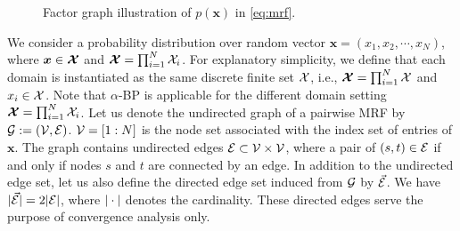 \begin{figure}
  \begin{centering}
    \caption{Factor graph illustration of $p(\bm{x})$ in \eqref{eq:mrf}.}\label{fig:factor-graph}
  \end{centering}
\end{figure}


We consider a probability distribution over random vector $\bm{x} = \left(  x_1, x_2, \cdots,  x_N  \right)$, where $\bm{x} \in \bm{\mathcal{X}}$ and $\bm{\mathcal{X}}=\prod_{i=1}^N\mathcal{X}_i$. For explanatory simplicity, we define that each domain is instantiated as the same discrete finite set $\mathcal{X}$, i.e., $\bm{\mathcal{X}}=\prod_{i=1}^N\mathcal{X}$ and $x_i \in \mathcal{X}$. Note that $\alpha$-BP is applicable for the different domain setting $\bm{\mathcal{X}}=\prod_{i=1}^N\mathcal{X}_i$. Let us denote the undirected graph of a pairwise MRF by $\mathcal{G}:=(\mathcal{V}, \mathcal{E})$. $\mathcal{V}=\left[ 1 : N \right]$ is the node set associated with the index set of entries of $\bm{x}$. The graph contains undirected edges $\mathcal{E} \subset \mathcal{V} \times \mathcal{V}$, where a pair of $(s, t) \in \mathcal{E}$ if and only if nodes $s$ and $t$ are connected by an edge. In addition to the undirected edge set, let us also define the directed edge set induced from $\mathcal{G}$ by $\vec{\mathcal{E}}$. We have $| \vec{\mathcal{E}} | = 2| \mathcal{E} |$, where $| \cdot |$ denotes the cardinality. These directed edges serve the purpose of convergence analysis only.



